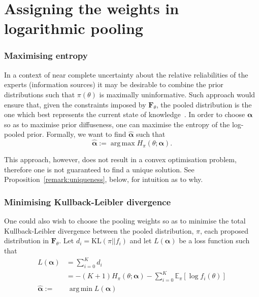 \documentclass[a4paper, notitlepage, 10pt]{article}
\DeclareMathOperator*{\argmin}{arg\,min}
\DeclareMathOperator*{\argmax}{arg\,max}
\begin{document}
\section{Assigning the weights in logarithmic pooling}
\label{sec:weights}

\subsubsection{Maximising entropy}
\label{sec:maxent}

In a context of near complete uncertainty about the relative reliabilities of the experts (information sources) it may be desirable to combine the prior distributions such that $\pi(\theta)$ is maximally uninformative. %
Such approach would ensure that, given the constraints imposed by $\mathbf{F}_{\theta}$, the pooled distribution is the one which best represents the current state of knowledge~\citep{jaynes1957,savchuk1994}.
In order to choose $\boldsymbol\alpha$ so as to maximise prior 
diffuseness, one can maximise the entropy of the log-pooled prior.  
%
%
Formally, we want to find $\hat{\boldsymbol\alpha}$ such that
\begin{equation}
\label{eq:argmaxEnt}
 \hat{\boldsymbol\alpha}:= \argmax H_{\pi}(\theta; \boldsymbol\alpha).
\end{equation}

This approach, however, does not result in a convex optimisation problem, therefore one is not guaranteed to find a unique solution. 
See Proposition~\ref{remark:uniqueness}, below, for intuition as to why.

\subsubsection{Minimising Kullback-Leibler divergence}
\label{sec:minKL}

One could also wish to choose the pooling weights so as to minimise the total Kullback-Leibler divergence between the pooled distribution, $\pi$, each proposed distribution in $\mathbf{F}_{\theta}$.
Let $d_i = \text{KL}(\pi || f_i)$ and let $L(\boldsymbol\alpha)$ be a loss function such that
\begin{align}
L(\boldsymbol\alpha) &= \sum_{i=0}^K d_i \\
\label{eq:KLexpanded}
     &= - (K+1) H_\pi(\theta; \boldsymbol\alpha)  - \sum_{i=0}^K \mathbb{E}_\pi\left[\log f_i(\theta) \right] \\
     \label{eq:argminKL}
     \hat{\boldsymbol\alpha}:=& \:\argmin L(\boldsymbol\alpha)   
\end{align}
\end{document}
